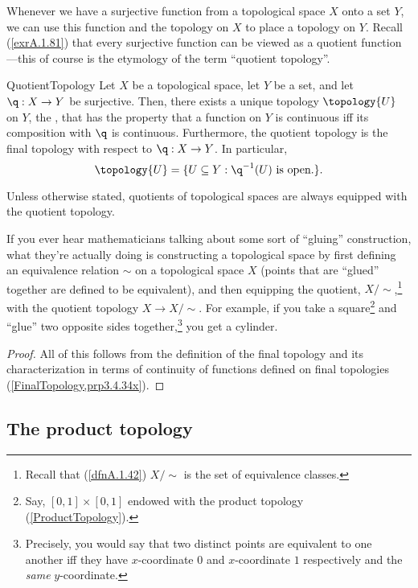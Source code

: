 Whenever we have a surjective function from a topological space $X$ onto a set $Y$, we can use this function and the topology on $X$ to place a topology on $Y$.  Recall (\cref{exrA.1.81}) that every surjective function can be viewed as a quotient function---this of course is the etymology of the term ``quotient topology''.
\begin{prp}{}{QuotientTopology}
Let $X$ be a topological space, let $Y$ be a set, and let $\q :X\rightarrow Y$ be surjective.  Then, there exists a unique topology $\topology{U}$ on $Y$, the , that has the property that a function on $Y$ is continuous iff its composition with $\q$ is continuous.  Furthermore, the quotient topology is the final topology with respect to $\q :X\rightarrow Y$.  In particular,
\begin{equation}
\topology{U}=\{ U\subseteq Y:\q ^{-1}(U)\text{ is open.}\} .
\end{equation}
\begin{rmk}
Unless otherwise stated, quotients of topological spaces are always equipped with the quotient topology.
\end{rmk}
\begin{rmk}
If you ever hear mathematicians talking about some sort of ``gluing'' construction, what they're actually doing is constructing a topological space by first defining an equivalence relation $\sim$ on a topological space $X$ (points that are ``glued'' together are defined to be equivalent), and then equipping the quotient, $X/\sim$,\footnote{Recall that (\cref{dfnA.1.42}) $X/\sim$ is the set of equivalence classes.} with the quotient topology $X\rightarrow X/\sim$.  For example, if you take a square\footnote{Say, $[0,1]\times [0,1]$ endowed with the product topology (\cref{ProductTopology}).} and ``glue'' two opposite sides together,\footnote{Precisely, you would say that two distinct points are equivalent to one another iff they have $x$-coordinate $0$ and $x$-coordinate $1$ respectively and the \emph{same} $y$-coordinate.} you get a cylinder.
\end{rmk}
\begin{proof}
All of this follows from the definition of the final topology and its characterization in terms of continuity of functions defined on final topologies (\cref{FinalTopology,prp3.4.34x}).
\end{proof}
\end{prp}

\subsection{The product topology}

